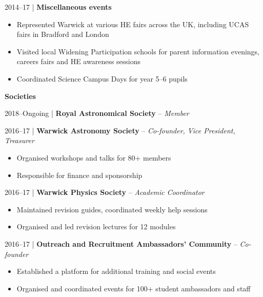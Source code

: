 \documentclass[10pt,a4paper]{altacv}
\begin{document}
\smallskip

\small 2014--17 | \textbf{Miscellaneous events} \\
\smallskip
\begin{itemize}
	\item Represented Warwick at various HE fairs across the UK, including UCAS fairs in Bradford and London
	\item Visited local Widening Participation schools for parent information evenings, careers fairs and HE awareness sessions
	\item Coordinated Science Campus Days for year 5--6 pupils
\end{itemize}

\divider

\normalsize \textbf{Societies}

\medskip

\small 2018--Ongoing | \textbf{Royal Astronomical Society} -- \textit{Member} \\

\smallskip

\small 2016--17 | \textbf{Warwick Astronomy Society} -- \textit{Co-founder, Vice President, Treasurer} \\
\smallskip
\begin{itemize}
	\item Organised workshops and talks for 80+ members
	\item Responsible for finance and sponsorship
\end{itemize}

\smallskip

\small 2016--17 | \textbf{Warwick Physics Society} -- \textit{Academic Coordinator} \\
\smallskip
\begin{itemize}
	\item Maintained revision guides, coordinated weekly help sessions
	\item Organised and led revision lectures for 12 modules
\end{itemize}

\smallskip

\small 2016--17 | \textbf{Outreach and Recruitment Ambassadors' Community} -- \textit{Co-founder} \\
\smallskip
\begin{itemize}
	\item Established a platform for additional training and social events
	\item Organised and coordinated events for 100+ student ambassadors and staff
\end{itemize}
\end{document}
